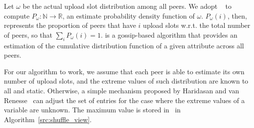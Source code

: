 Let $\omega$ be the actual upload slot distribution among all peers. We
adopt \adam~\cite{adam2} to compute $P_{\omega}: \mathbb{N} \rightarrow
\mathbb{R}$, an estimate probability density function of $\omega$.
$P_{\omega}(i)$, then, represents the proportion of peers that have $i$ upload
slots w.r.t. the total number of peers, so that $\sum_i P_{\omega}(i) = 1$.
\adam is a gossip-based algorithm that provides an estimation of the
cumulative distribution function of a given attribute across all peers.

For our algorithm to work, we assume that each peer is able to estimate its
own number of upload slots, and the extreme values of such distribution are
known to all and static. Otherwise, a simple mechanism proposed by Haridasan
and van Renesse~\cite{gossipestimation} can adjust the set of entries for the
case where the extreme values of a variable are unknown. The maximum value is
stored in \maxslot\ in Algorithm~\ref{src:shuffle_view}.

